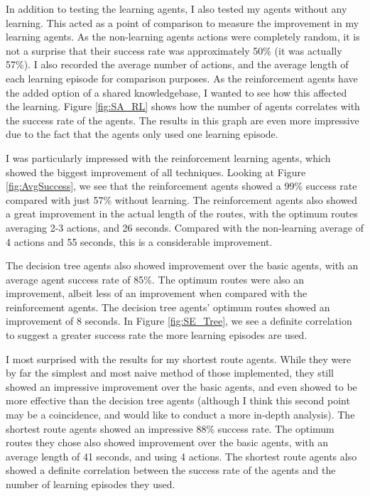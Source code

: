 \documentclass[a4paper,oneside]{report}
\begin{document}
In addition to testing the learning agents, I also tested my agents without any learning. This acted as a point of comparison to measure the improvement in my learning agents. As the non-learning agents actions were completely random, it is not a surprise that their success rate was approximately 50\% (it was actually 57\%). I also recorded the average number of actions, and the average length of each learning episode for comparison purposes. As the reinforcement agents have the added option of a shared knowledgebase, I wanted to see how this affected the learning. Figure \ref{fig:SA_RL} shows how the number of agents correlates with the success rate of the agents. The results in this graph are even more impressive due to the fact that the agents only used one learning episode.

I was particularly impressed with the reinforcement learning agents, which showed the biggest improvement of all techniques. Looking at Figure \ref{fig:AvgSuccess}, we see that the reinforcement agents showed a 99\% success rate compared with just 57\% without learning. The reinforcement agents also showed a great improvement in the actual length of the routes, with the optimum routes averaging 2-3 actions, and 26 seconds. Compared with the non-learning average of 4 actions and 55 seconds, this is a considerable improvement.

The decision tree agents also showed improvement over the basic agents, with an average agent success rate of 85\%. The optimum routes were also an improvement, albeit less of an improvement when compared with the reinforcement agents. The decision tree agents' optimum routes showed an improvement of 8 seconds. In Figure \ref{fig:SE_Tree}, we see a definite correlation to suggest a greater success rate the more learning episodes are used.

I most surprised with the results for my shortest route agents. While they were by far the simplest and most naive method of those implemented, they still showed an impressive improvement over the basic agents, and even showed to be more effective than the decision tree agents (although I think this second point may be a coincidence, and would like to conduct a more in-depth analysis). The shortest route agents showed an impressive 88\% success rate. The optimum routes they chose also showed improvement over the basic agents, with an average length of 41 seconds, and using 4 actions. The shortest route agents also showed a definite correlation between the success rate of the agents and the number of learning episodes they used.
\end{document}
